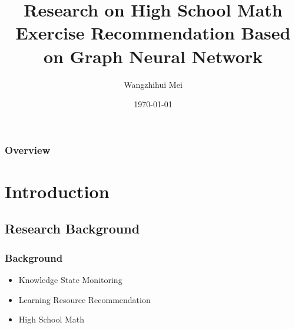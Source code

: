 \documentclass{beamer}
\title[Exercise Recommendation]{Research on High School Math Exercise Recommendation Based on Graph Neural Network} %
\author{Wangzhihui Mei} %
\institute[UOW] 
{
University of Wollongong \\ %
\medskip
\textit{maywzh@gmail.com} %
}
\date{\today} %
\begin{document}
\begin{frame}
  \titlepage %
\end{frame}

\begin{frame}
  \frametitle{Overview} %
  \tableofcontents %
\end{frame}


\section{Introduction}
\subsection{Research Background}
\begin{frame}
  \frametitle{Background}
  \begin{itemize}
    \item Knowledge State Monitoring
    \item Learning Resource Recommendation
    \item High School Math
  \end{itemize}
\end{frame}

\end{document}
